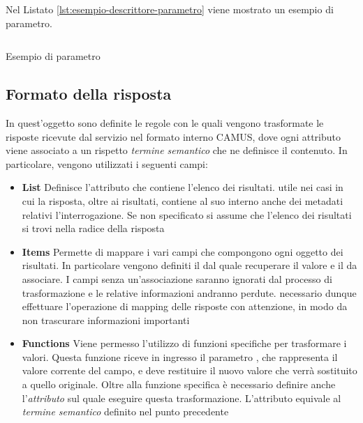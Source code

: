 Nel Listato \ref{lst:esempio-descrittore-parametro} viene mostrato un esempio di parametro.

\begin{listing}[H]
	\inputminted{json}{5-implementazione-backend/Codice/esempio_descrittore_parametro.json}
	\caption{Esempio di parametro}
	\label{lst:esempio-descrittore-parametro}
\end{listing}

\subsection{Formato della risposta\label{sec:descrittore-risposta}}

In quest'oggetto sono definite le regole con le quali vengono trasformate le risposte ricevute dal servizio nel formato interno CAMUS, dove ogni attributo viene associato a un rispetto \emph{termine semantico} che ne definisce il contenuto. In particolare, vengono utilizzati i seguenti campi:

\begin{itemize}
	\item \textbf{List}
	Definisce l'attributo che contiene l'elenco dei risultati. \upe utile nei casi in cui la risposta, oltre ai risultati, contiene al suo interno anche dei metadati relativi l'interrogazione. Se non specificato si assume che l'elenco dei risultati si trovi nella radice della risposta
	\item \textbf{Items}
	Permette di mappare i vari campi che compongono ogni oggetto dei risultati. In particolare vengono definiti il  dal quale recuperare il valore e il  da associare. I campi senza un'associazione saranno ignorati dal processo di trasformazione e le relative informazioni andranno perdute. \upe necessario dunque effettuare l'operazione di mapping delle risposte con attenzione, in modo da non trascurare informazioni importanti
	\item \textbf{Functions}
	Viene permesso l'utilizzo di funzioni specifiche per trasformare i valori. Questa funzione riceve in ingresso il parametro , che rappresenta il valore corrente del campo, e deve restituire il nuovo valore che verrà sostituito a quello originale. Oltre alla funzione specifica è necessario definire anche l'\emph{attributo} sul quale eseguire questa trasformazione. L'attributo equivale al \emph{termine semantico} definito nel punto precedente
\end{itemize}

